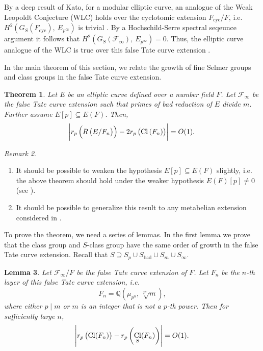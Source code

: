\documentclass{amsart}
\DeclareMathOperator{\cyc}{cyc}
\DeclareMathOperator{\Cl}{Cl}
\DeclareMathOperator{\bad}{bad}
\newcommand{\QQ}{\mathbb Q}
\newcommand{\F}{\mathcal F}
\newtheorem{Th}{Theorem}[section]
\newtheorem{Lemma}[Th]{Lemma}
\theoremstyle{definition}
\theoremstyle{remark}
\newtheorem{rem}[Th]{Remark}
\begin{document}
By a deep result of Kato, for a modular elliptic curve, an analogue of the Weak Leopoldt Conjecture (WLC) holds over the cyclotomic extension $F_{\cyc}/F$, i.e. $H^2\left( G_S\left( F_{\cyc} \right), \ E_{p^\infty}\right)$ is trivial \cite{Kat04}.
By a Hochschild-Serre spectral seqeunce argument it follows that $H^2\left( G_S\left( \F_\infty \right), \ E_{p^\infty}\right) =0$.
Thus, the elliptic curve analogue of the WLC is true over this false Tate curve extension \cite[Remark 2.2]{HV03}.

In the main theorem of this section, we relate the growth of fine Selmer groups and class groups in the false Tate curve extension. 

\begin{Th}
\label{thm: relate fsg and class group in false tate curve}
Let $E$ be an elliptic curve defined over a number field $F$.
Let $\F_\infty$ be the false Tate curve extension such that primes of bad reduction of $E$ divide $m$.
Further assume $E[p]\subseteq E(F)$. 
Then,
\[
\abs{r_p\left(R\left(E/F_n\right)\right) - 2 r_p\left(\Cl\left(F_n\right)\right) } = O(1).
\] 
\end{Th}

\begin{rem}
\begin{enumerate}
\item It should be possible to weaken the hypothesis $E[p]\subseteq E(F)$ slightly, i.e. the above theorem should hold under the weaker hypothesis $E(F)[p]\neq 0$ (see \cite{Kun20_thesis}).
\item It should be possible to generalize this result to any metabelian extension considered in \cite{Lei17}.
\end{enumerate}
\end{rem}

To prove the theorem, we need a series of lemmas.
In the first lemma we prove that the class group and $S$-class group have the same order of growth in the false Tate curve extension.
Recall that $S\supseteq S_p \cup S_{\bad} \cup S_m \cup S_\infty$.

\begin{Lemma}
\label{lemma relate S class group to the regular one}
Let $\F_\infty/F$ be the false Tate curve extension of $F$. 
Let $F_n$ be the $n$-th layer of this false Tate curve extension, i.e.
\[
F_n = \QQ\left(\mu_{p^n}, \ \sqrt[p^n]{m}\right),
\]
where either $p\mid m$ or $m$ is an integer that is not a $p$-th power.
Then for sufficiently large $n$,
\[
\abs{r_p\left(\Cl(F_n)\right) - r_p\left(\Cl_S(F_n)\right) } = O(1).
\]
\end{Lemma}
\end{document}
